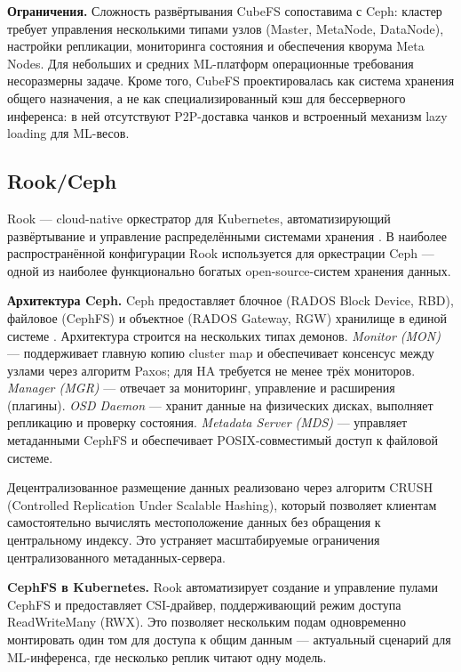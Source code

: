 \textbf{Ограничения.} Сложность развёртывания CubeFS сопоставима с Ceph: кластер требует управления несколькими типами узлов (Master, MetaNode, DataNode), настройки репликации, мониторинга состояния и обеспечения кворума Meta Nodes. Для небольших и средних ML-платформ операционные требования несоразмерны задаче. Кроме того, CubeFS проектировалась как система хранения общего назначения, а не как специализированный кэш для бессерверного инференса: в ней отсутствуют P2P-доставка чанков и встроенный механизм lazy loading для ML-весов.

\subsection*{Rook/Ceph}

Rook --- cloud-native оркестратор для Kubernetes, автоматизирующий развёртывание и управление распределёнными системами хранения \cite{rook_docs}. В наиболее распространённой конфигурации Rook используется для оркестрации Ceph --- одной из наиболее функционально богатых open-source-систем хранения данных.

\textbf{Архитектура Ceph.} Ceph предоставляет блочное (RADOS Block Device, RBD), файловое (CephFS) и объектное (RADOS Gateway, RGW) хранилище в единой системе \cite{ceph_arch}. Архитектура строится на нескольких типах демонов. \textit{Monitor (MON)} --- поддерживает главную копию cluster map и обеспечивает консенсус между узлами через алгоритм Paxos; для HA требуется не менее трёх мониторов. \textit{Manager (MGR)} --- отвечает за мониторинг, управление и расширения (плагины). \textit{OSD Daemon} --- хранит данные на физических дисках, выполняет репликацию и проверку состояния. \textit{Metadata Server (MDS)} --- управляет метаданными CephFS и обеспечивает POSIX-совместимый доступ к файловой системе.

Децентрализованное размещение данных реализовано через алгоритм CRUSH (Controlled Replication Under Scalable Hashing), который позволяет клиентам самостоятельно вычислять местоположение данных без обращения к центральному индексу. Это устраняет масштабируемые ограничения централизованного метаданных-сервера.

\textbf{CephFS в Kubernetes.} Rook автоматизирует создание и управление пулами CephFS и предоставляет CSI-драйвер, поддерживающий режим доступа ReadWriteMany (RWX). Это позволяет нескольким подам одновременно монтировать один том для доступа к общим данным --- актуальный сценарий для ML-инференса, где несколько реплик читают одну модель.

